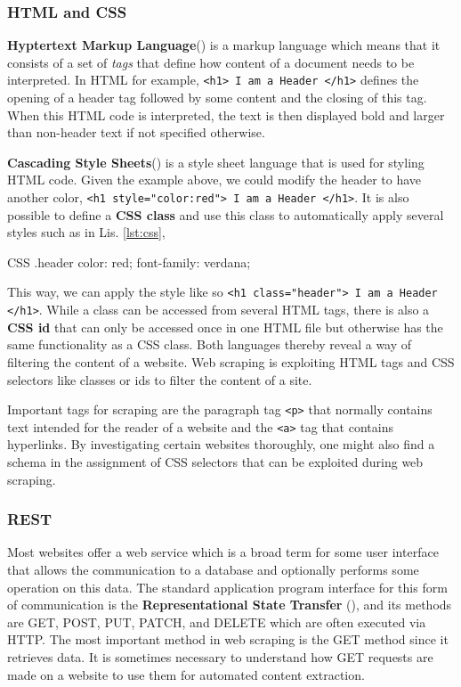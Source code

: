 \subsubsection{HTML and CSS}
  \textbf{Hyptertext Markup Language}() is a markup language which means that it consists of a set of \textsl{tags} that define how content of a document needs to be interpreted.
  In HTML for example, \texttt{<h1> I am a Header </h1>} defines the opening of a header tag followed by some content and the closing of this tag.
  When this HTML code is interpreted, the text is then displayed bold and larger than non-header text if not specified otherwise.

  \textbf{Cascading Style Sheets}() is a style sheet language that is used for styling HTML code.
  Given the example above, we could modify the header to have another color, \texttt{<h1 style="color:red">  I am a Header </h1>}.
  It is also possible to define a \textbf{CSS class} and use this class to automatically apply several styles such as in Lis. \ref{lst:css},
  \begin{listing}[h!]
    \centering
    \begin{cminted}{CSS}
      .header {
        color: red;
        font-family: verdana;
      }
    \end{cminted}
    \caption{CSS class named \emph{header} that sets the font to verdana and color to red when used.}
    \label{lst:css}
  \end{listing}
%
  This way, we can apply the style like so \texttt{<h1 class="header"> I am a Header </h1>}.
  While a class can be accessed from several HTML tags, there is also a \textbf{CSS id} that can only be accessed once in one HTML file but otherwise has the same functionality as a CSS class.
  Both languages thereby reveal a way of filtering the content of a website.
  Web scraping is exploiting HTML tags and CSS selectors like classes or ids to filter the content of a site.

  Important tags for scraping are the paragraph tag \texttt{<p>} that normally contains text intended for the reader of a website and the \texttt{<a>} tag that contains hyperlinks.
  By investigating certain websites thoroughly, one might also find a schema in the assignment of CSS selectors that can be exploited during web scraping.

\subsubsection{REST}
  Most websites offer a web service which is a broad term for some user interface that allows the communication to a database and optionally performs some operation on this data.
  The standard application program interface for this form of communication is the \textbf{Representational State Transfer} (), and its methods are GET, POST, PUT, PATCH, and DELETE which are often executed via HTTP.
  The most important method in web scraping is the GET method since it retrieves data.
  It is sometimes necessary to understand how GET requests are made on a website to use them for automated content extraction.

